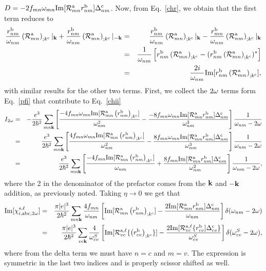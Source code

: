 $D=-2f_{mn}\omega_{mn}\mathrm{Im}[{\cal  R}^{\mathrm{a}}_{mn}r^{\mathrm{b}}_{nm}]\Delta^{\mathrm{c}}_{nm}$.
 Now, from Eq.~\eqref{chr}, we obtain
that the first term reduces to
\begin{eqnarray}\label{chrn2}
\frac{r^{\mathrm{b}}_{nm}}{\omega_{nm}}\left({\cal R}^{\mathrm{a}}_{mn}\right)_{;k^{\mathrm{c}}}|_{\mathbf{k}}
+
\frac{r^{\mathrm{b}}_{nm}}{\omega_{nm}}\left({\cal R}^{\mathrm{a}}_{mn}\right)_{;k^{\mathrm{c}}}|_{-\mathbf{k}}
&=&
\frac{r^{\mathrm{b}}_{nm}}{\omega_{nm}}\left({\cal R}^{\mathrm{a}}_{mn}\right)_{;k^{\mathrm{c}}}|_{\mathbf{k}}
-
\frac{r^{\mathrm{b}}_{mn}}{\omega_{nm}}\left({\cal R}^{\mathrm{a}}_{nm}\right)_{;k^{\mathrm{c}}}|_{\mathbf{k}}
\nonumber\\
&=&
\frac{1}{\omega_{nm}}\left[r^{\mathrm{b}}_{nm}\left({\cal R}^{\mathrm{a}}_{mn}\right)_{;k^{\mathrm{c}}}
-
(r^{\mathrm{b}}_{nm}\left({\cal R}^{\mathrm{a}}_{mn}\right)_{;k^{\mathrm{c}}})^*\right]
\nonumber\\
&=&
\frac{2i}{\omega_{nm}}\mathrm{Im}[r^{\mathrm{b}}_{nm}\left({\cal R}^{\mathrm{a}}_{mn}\right)_{;k^{\mathrm{c}}}]
,
\end{eqnarray}
with similar results for the other two terms. First, we collect the
$2\omega$ terms form Eq.~\eqref{pfi} that contribute to Eq.~\eqref{chii}
\begin{eqnarray}\label{2wchii}
I_{2\omega}&=&
-\frac{e^3}{2\hbar^2}\sum_{mn\mathbf{k}}
\left[
\frac{-4f_{mn}\omega_{mn}\mathrm{Im}[{\cal R}^{\mathrm{a}}_{mn}\left(r^{\mathrm{b}}_{nm}\right)_{;k^{\mathrm{c}}}]}{\omega^2_{nm}}
-
\frac{-8f_{mn}\omega_{mn}\mathrm{Im}[{\cal R}^{\mathrm{a}}_{mn}r^{\mathrm{b}}_{nm}]\Delta^{\mathrm{c}}_{nm}}{\omega^3_{nm}}
\right]\frac{1}{\omega_{nm}-2\omega}
\nonumber\\
&=&
\frac{e^3}{2\hbar^2}\sum_{mn\mathbf{k}}
\left[
\frac{4f_{mn}\omega_{mn}\mathrm{Im}[{\cal R}^{\mathrm{a}}_{mn}\left(r^{\mathrm{b}}_{nm}\right)_{;k^{\mathrm{c}}}]}{\omega^2_{nm}}
-
\frac{8f_{mn}\omega_{mn}\mathrm{Im}[{\cal R}^{\mathrm{a}}_{mn}r^{\mathrm{b}}_{nm}]\Delta^{\mathrm{c}}_{nm}}{\omega^3_{nm}}
\right]\frac{1}{\omega_{nm}-2\omega}
\nonumber\\
&=&
\frac{e^3}{2\hbar^2}\sum_{mn\mathbf{k}}
\left[
\frac{-4f_{mn}\mathrm{Im}[{\cal R}^{\mathrm{a}}_{mn}\left(r^{\mathrm{b}}_{nm}\right)_{;k^{\mathrm{c}}}]}{\omega_{nm}}
+
\frac{8f_{mn}\mathrm{Im}[{\cal R}^{\mathrm{a}}_{mn}r^{\mathrm{b}}_{nm}]\Delta^{\mathrm{c}}_{nm}}{\omega^2_{nm}}
\right]\frac{1}{\omega_{nm}-2\omega}
,
\end{eqnarray}
where the 2 in the denominator of the prefactor
comes from the $\mathbf{k}$ and $-\mathbf{k}$ addition, as previously noted.
Taking $\eta\to 0$ we get that
\begin{eqnarray}\label{imchi2w}
\mathrm{Im}[\chi_{i,\mathrm{a}\mathrm{b}\mathrm{c},2\omega}^{s,\ell}]
&=&
\frac{\pi|e|^3}{2\hbar^2}\sum_{mn\mathbf{k}}
\frac{4f_{mn}}{\omega_{nm}}
\left[
\mathrm{Im}[{\cal R}^{\mathrm{a}}_{mn}\left(r^{\mathrm{b}}_{nm}\right)_{;k^{\mathrm{c}}}]
-
\frac{2\mathrm{Im}[{\cal R}^{\mathrm{a}}_{mn}r^{\mathrm{b}}_{nm}]\Delta^{\mathrm{c}}_{nm}}{\omega_{nm}}
\right]\delta(\omega_{nm}-2\omega)
\nonumber \\
&=&
\frac{\pi|e|^3}{2\hbar^2}\sum_{vc\mathbf{k}}
\frac{4}{\omega^S_{cv}}
\left[
\mathrm{Im}[{\cal R}^{\mathrm{a},\ell}_{vc}\{\left(r^{\mathrm{b}}_{cv}\right)_{;k^{\mathrm{c}}}\}]
-
\frac{2\mathrm{Im}[{\cal R}^{\mathrm{a},\ell}_{vc}\{r^{\mathrm{b}}_{cv}]\Delta^{\mathrm{c}}_{cv}\}}{\omega^S_{cv}}
\right]\delta(\omega^S_{cv}-2\omega)
,
\end{eqnarray} 
where from the delta term we must have $n=c$ and $m=v$. The expression
is symmetric in the last two indices and is properly scissor shifted
as well. 

